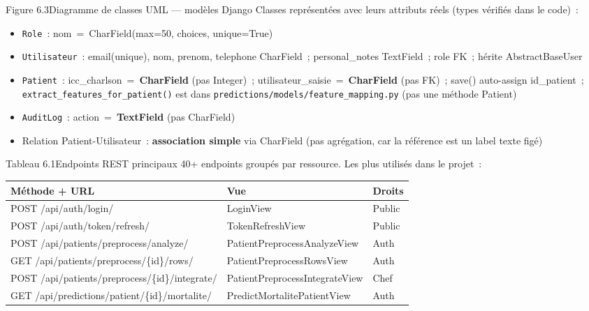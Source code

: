\documentclass[12pt,a4paper]{article}
\begin{document}
\begin{figbox}{Figure 6.3}{Diagramme de classes UML --- modèles Django}
Classes représentées avec leurs attributs réels (types vérifiés dans le code)~:
\begin{itemize}[leftmargin=1.5em, itemsep=1pt]
  \item \texttt{Role}~: nom~=~CharField(max=50, choices, unique=True)
  \item \texttt{Utilisateur}~: email(unique), nom, prenom, telephone CharField~;
    personal\_notes TextField~; role FK~; hérite AbstractBaseUser
  \item \texttt{Patient}~: icc\_charlson~=~\textbf{CharField} (pas Integer)~;
    utilisateur\_saisie~=~\textbf{CharField} (pas FK)~; save() auto-assign
    id\_patient~; \texttt{extract\_features\_for\_patient()} est dans
    \texttt{predictions/models/feature\_mapping.py} (pas une méthode Patient)
  \item \texttt{AuditLog}~: action~=~\textbf{TextField} (pas CharField)
  \item Relation Patient-Utilisateur~: \textbf{association simple} via
    CharField (pas agrégation, car la référence est un label texte figé)
\end{itemize}
\end{figbox}

\begin{figbox}{Tableau 6.1}{Endpoints REST principaux}
40+ endpoints groupés par ressource. Les plus utilisés dans le projet~:
\begin{center}
\small
\begin{tabular}{lll}
\toprule
\textbf{Méthode + URL} & \textbf{Vue} & \textbf{Droits} \\
\midrule
POST /api/auth/login/ & LoginView & Public \\
POST /api/auth/token/refresh/ & TokenRefreshView & Public \\
POST /api/patients/preprocess/analyze/ & PatientPreprocessAnalyzeView & Auth \\
GET /api/patients/preprocess/\{id\}/rows/ & PatientPreprocessRowsView & Auth \\
POST /api/patients/preprocess/\{id\}/integrate/ & PatientPreprocessIntegrateView & Chef \\
GET /api/predictions/patient/\{id\}/mortalite/ & PredictMortalitePatientView & Auth \\
\bottomrule
\end{tabular}
\end{center}
\end{figbox}
\end{document}
